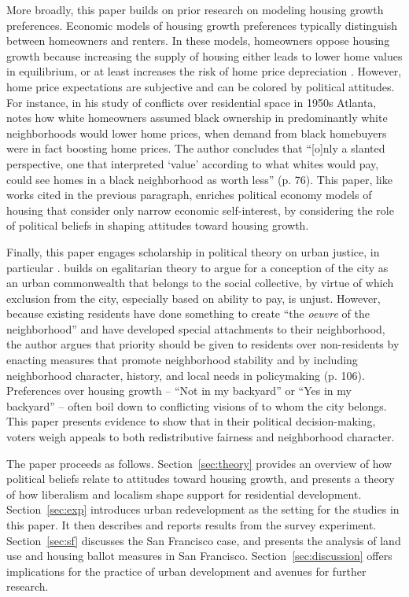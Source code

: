 \documentclass[article,11pt]{memoir}
\begin{document}
More broadly, this paper builds on prior research on modeling housing growth preferences.  Economic models of housing growth preferences typically distinguish between homeowners and renters.  In these models, homeowners oppose housing growth because increasing the supply of housing either leads to lower home values in equilibrium, or at least increases the risk of home price depreciation \citep{fischel_homevoter_2001,ortalo-magne_political_2014}. However, home price expectations are subjective and can be colored by political attitudes. For instance, in his study of conflicts over residential space in 1950s Atlanta, \cite{kruse_white_2005} notes how white homeowners assumed black ownership in predominantly white neighborhoods would lower home prices, when demand from black homebuyers were in fact boosting home prices.  The author concludes that ``[o]nly a slanted perspective, one that interpreted `value' according to what whites would pay, could see homes in a black neighborhood as worth less'' (p. 76). This paper, like works cited in the previous paragraph, enriches political economy models of housing that consider only narrow economic self-interest, by considering the role of political beliefs in shaping attitudes toward housing growth.

Finally, this paper engages scholarship in political theory on urban justice, in particular \cite{kohn_death_2016}. \cite{kohn_death_2016} builds on egalitarian theory to argue for a conception of the city as an urban commonwealth that belongs to the social collective, by virtue of which exclusion from the city, especially based on ability to pay, is unjust. However, because existing residents have done something to create ``the \emph{oeuvre} of the neighborhood'' and have developed special attachments to their neighborhood, the author argues that priority should be given to residents over non-residents by enacting measures that promote neighborhood stability and by including neighborhood character, history, and local needs in policymaking (p. 106). Preferences over housing growth -- ``Not in my backyard'' or ``Yes in my backyard'' -- often boil down to conflicting visions of to whom the city belongs. This paper presents evidence to show that in their political decision-making, voters weigh appeals to both redistributive fairness and neighborhood character.

The paper proceeds as follows. Section~\ref{sec:theory} provides an overview of how political beliefs relate to attitudes toward housing growth, and presents a theory of how liberalism and localism shape support for residential development. Section~\ref{sec:exp} introduces urban redevelopment as the setting for the studies in this paper. It then describes and reports results from the survey experiment. Section~\ref{sec:sf} discusses the San Francisco case, and presents the analysis of land use and housing ballot measures in San Francisco. Section~\ref{sec:discussion} offers implications for the practice of urban development and avenues for further research.
\end{document}
